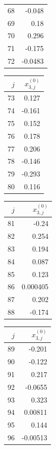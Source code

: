 {\begin{tabular}[t]{r|r}
68 & -0.048 \\
69 & 0.18 \\
70 & 0.296 \\
71 & -0.175 \\
72 & -0.0483
\end{tabular}\kern4pt
\begin{tabular}[t]{r|r}
$j$ & $x^{(0)}_{3,j}$ \\\hline
73 & 0.127 \\
74 & -0.161 \\
75 & 0.152 \\
76 & 0.178 \\
77 & 0.206 \\
78 & -0.146 \\
79 & -0.293 \\
80 & 0.116
\end{tabular}\kern4pt
\begin{tabular}[t]{r|r}
$j$ & $x^{(0)}_{3,j}$ \\\hline
81 & -0.24 \\
82 & 0.254 \\
83 & 0.194 \\
84 & 0.087 \\
85 & 0.123 \\
86 & 0.000405 \\
87 & 0.202 \\
88 & -0.174
\end{tabular}\kern4pt
\begin{tabular}[t]{r|r}
$j$ & $x^{(0)}_{3,j}$ \\\hline
89 & -0.201 \\
90 & -0.122 \\
91 & 0.217 \\
92 & -0.0655 \\
93 & 0.323 \\
94 & 0.00811 \\
95 & 0.144 \\
96 & -0.00513
\end{tabular}}

